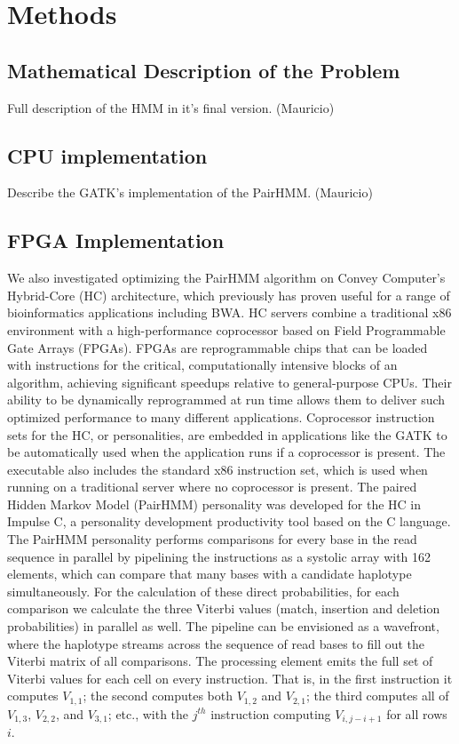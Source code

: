 \documentclass[11pt, oneside]{article}
\begin{document}
	\section{Methods} 
	
	\subsection{Mathematical Description of the Problem} 
	
	Full description of the HMM in it's final version.  (Mauricio) 
	
	\subsection{CPU implementation} 
	
	Describe the GATK's implementation of the PairHMM. (Mauricio) 
	
	\subsection{FPGA Implementation} 
	
	We also investigated optimizing the PairHMM algorithm on Convey Computer’s
	Hybrid-Core (HC) architecture, which previously has proven useful for a
	range of bioinformatics applications including BWA. HC servers combine a
	traditional x86 environment with a high-performance coprocessor based on
	Field Programmable Gate Arrays (FPGAs).  FPGAs are reprogrammable chips that
	can be loaded with instructions for the critical, computationally intensive
	blocks of an algorithm, achieving significant speedups relative to
	general-purpose CPUs. Their ability to be dynamically reprogrammed at run
	time allows them to deliver such optimized performance to many different
	applications.   Coprocessor instruction sets for the HC, or personalities,
	are embedded in applications like the GATK to be automatically used when the
	application runs if a coprocessor is present.  The executable also includes
	the standard x86 instruction set, which is used when running on a
	traditional server where no coprocessor is present.  The paired Hidden
	Markov Model (PairHMM) personality was developed for the HC in Impulse C,
	a personality development productivity tool based on the C language.  The
	PairHMM personality performs comparisons for every base in the read sequence
	in parallel by pipelining the instructions as a systolic array with 162
	elements, which can compare that many bases with a candidate haplotype
	simultaneously.  For the calculation of these direct probabilities, for each
	comparison we calculate the three Viterbi values
	(match, insertion and deletion probabilities) in parallel as well.  The pipeline can be
	envisioned as a wavefront, where the haplotype streams across the sequence
	of read bases to fill out the Viterbi matrix of all comparisons.  The
	processing element emits the full set of Viterbi values for each cell on
	every instruction.  That is, in the first instruction it computes $V_{1,1}$; the
	second computes both $V_{1,2}$ and $V_{2,1}$; the third computes all of $V_{1,3}$, $V_{2,2}$,
	and $V_{3,1}$; etc., with the $j^{th}$ instruction computing $V_{i,j−i+1}$
	for all rows $i$.
	
\end{document}
